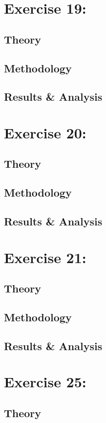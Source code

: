 \documentclass[%
reprint,
amsmath,amssymb,
aps,
floatfix
]{revtex4-2}
\begin{document}
	\section{Exercise 19: }
		\subsection{Theory}
		\subsection{Methodology}
		\subsection{Results \& Analysis}
	
	\section{Exercise 20: }
		\subsection{Theory}
		\subsection{Methodology}
		\subsection{Results \& Analysis}
		
	\section{Exercise 21: }
		\subsection{Theory}
		\subsection{Methodology}
		\subsection{Results \& Analysis}
		
	\section{Exercise 25: }
		\subsection{Theory}
\end{document}
